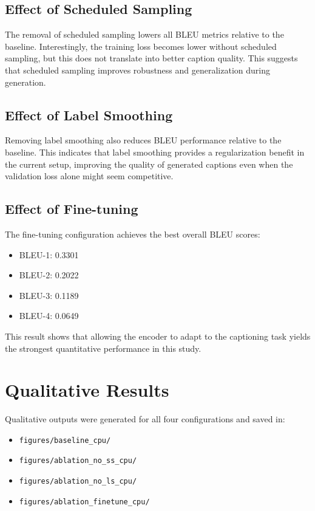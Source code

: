 \documentclass[11pt,a4paper]{article}
\begin{document}
\subsection{Effect of Scheduled Sampling}

The removal of scheduled sampling lowers all BLEU metrics relative to the baseline. Interestingly, the training loss becomes lower without scheduled sampling, but this does not translate into better caption quality. This suggests that scheduled sampling improves robustness and generalization during generation.

\subsection{Effect of Label Smoothing}

Removing label smoothing also reduces BLEU performance relative to the baseline. This indicates that label smoothing provides a regularization benefit in the current setup, improving the quality of generated captions even when the validation loss alone might seem competitive.

\subsection{Effect of Fine-tuning}

The fine-tuning configuration achieves the best overall BLEU scores:
\begin{itemize}[leftmargin=*]
    \item BLEU-1: 0.3301
    \item BLEU-2: 0.2022
    \item BLEU-3: 0.1189
    \item BLEU-4: 0.0649
\end{itemize}

This result shows that allowing the encoder to adapt to the captioning task yields the strongest quantitative performance in this study.

\section{Qualitative Results}

Qualitative outputs were generated for all four configurations and saved in:
\begin{itemize}[leftmargin=*]
    \item \texttt{figures/baseline\_cpu/}
    \item \texttt{figures/ablation\_no\_ss\_cpu/}
    \item \texttt{figures/ablation\_no\_ls\_cpu/}
    \item \texttt{figures/ablation\_finetune\_cpu/}
\end{itemize}
\end{document}
